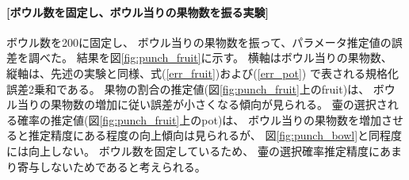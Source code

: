 \documentclass[a4j]{jarticle}
\begin{document}
\paragraph{[ボウル数を固定し、ボウル当りの果物数を振る実験]}
ボウル数を200に固定し、
ボウル当りの果物数を振って、パラメータ推定値の誤差を調べた。
結果を図\ref{fig:punch_fruit}に示す。
横軸はボウル当りの果物数、
縦軸は、先述の実験と同様、式(\ref{err_fruit})および(\ref{err_pot})
で表される規格化誤差2乗和である。
果物の割合の推定値(図\ref{fig:punch_fruit}上のfruit)は、
ボウル当りの果物数の増加に従い誤差が小さくなる傾向が見られる。
壷の選択される確率の推定値(図\ref{fig:punch_fruit}上のpot)は、
ボウル当りの果物数を増加させると推定精度にある程度の向上傾向は見られるが、
図\ref{fig:punch_bowl}と同程度には向上しない。
ボウル数を固定しているため、
壷の選択確率推定精度にあまり寄与しないためであると考えられる。
\end{document}

